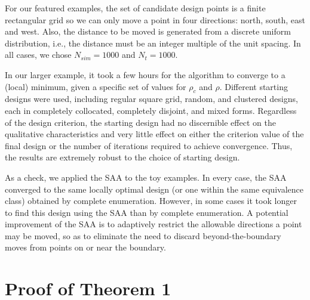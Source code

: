 \documentclass[12pt]{article}
\begin{document}
        For our featured examples, the set of candidate design points is a finite rectangular grid
so we can only move a point in four directions: north, south,
east and west.  Also, the distance
to be moved is generated from a discrete uniform distribution, i.e.,
the distance must be an integer multiple of the unit spacing. In
all cases, we chose $N_{sim}=1000$ and $N_{t}=1000$.

        In our larger example, it took a few hours for the algorithm to
        converge to a (local) minimum, given a specific set of
        values for $\rho_c$ and $\rho$.
Different starting designs were used, including regular square grid, random, and clustered
designs, each in completely collocated, completely disjoint, and mixed forms.
Regardless of the design criterion, the starting design had no discernible effect on the qualitative
characteristics and very little effect on either the criterion value of the final design or the number of
iterations required to achieve convergence.  Thus, the results are extremely robust to the choice of starting design.

As a check, we applied the SAA to the toy examples.  In every case, the SAA converged to the same locally optimal design (or one within the same equivalence class) obtained by complete enumeration.  However, in some cases it took longer to find this design using the SAA than by complete enumeration. A potential improvement of the SAA is to adaptively restrict the allowable directions a point may be moved, so as to eliminate the need to discard beyond-the-boundary moves from points on or near the boundary.

\newpage
\section{Proof of Theorem 1}
\normalsize
\end{document}

